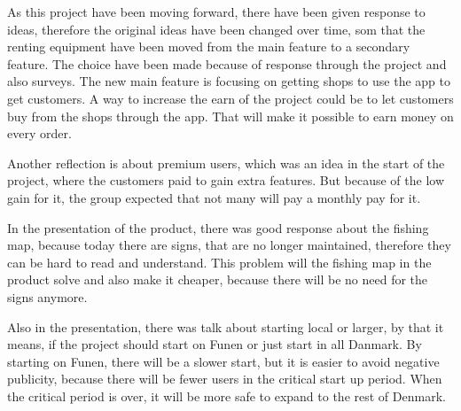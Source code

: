 As this project have been moving forward, there have been given response to ideas, therefore the original ideas have been changed over time, som that the renting equipment have been moved from the main feature to a secondary feature. The choice have been made because of response through the project and also surveys. The new main feature is focusing on getting shops to use the app to get customers. A way to increase the earn of the project could be to let customers buy from the shops through the app. That will make it possible to earn money on every order. 


Another reflection is about premium users, which was an idea in the start of the project, where the customers paid to gain extra features. But because of the low gain for it, the group expected that not many will pay a monthly pay for it. 


In the presentation of the product, there was good response about the fishing map, because today there are signs, that are no longer  maintained, therefore they can be hard to read and understand. This problem will the fishing map in the product solve and also make it cheaper, because there will be no need for the signs anymore.


Also in the presentation, there was talk about starting local or larger, by that it means, if the project should start on Funen or just start in all Danmark. By starting on Funen, there will be a slower start, but it is easier to avoid negative publicity, because there will be fewer users in the critical start up period. When the critical period is over, it will be more safe to expand to the rest of Denmark.